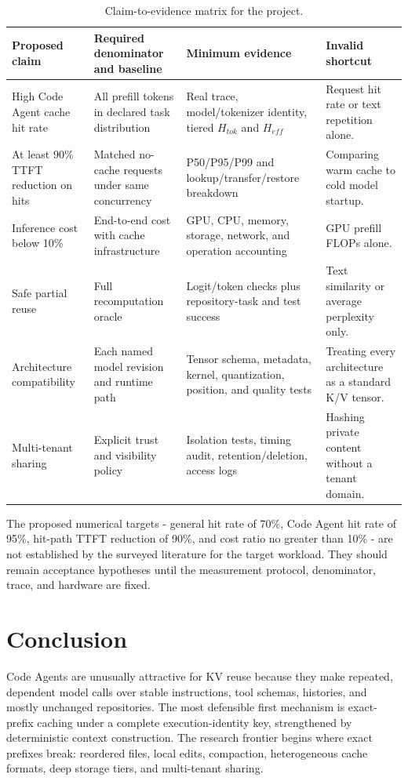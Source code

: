 \documentclass[conference,10pt]{IEEEtran}
\newcommand{\ttft}{TTFT\xspace}
\begin{document}
\begin{table}[t]
\caption{Claim-to-evidence matrix for the project.}
\label{tab:agenda}
\centering
\small
\begin{tabularx}{\textwidth}{p{}p{}p{}Y}
\toprule
Proposed claim & Required denominator and baseline & Minimum evidence & Invalid shortcut \\
\midrule
High Code Agent cache hit rate & All prefill tokens in declared task distribution & Real trace, model/tokenizer identity, tiered $H_{tok}$ and $H_{eff}$ & Request hit rate or text repetition alone. \\
At least 90\% \ttft reduction on hits & Matched no-cache requests under same concurrency & P50/P95/P99 and lookup/transfer/restore breakdown & Comparing warm cache to cold model startup. \\
Inference cost below 10\% & End-to-end cost with cache infrastructure & GPU, CPU, memory, storage, network, and operation accounting & GPU prefill FLOPs alone. \\
Safe partial reuse & Full recomputation oracle & Logit/token checks plus repository-task and test success & Text similarity or average perplexity only. \\
Architecture compatibility & Each named model revision and runtime path & Tensor schema, metadata, kernel, quantization, position, and quality tests & Treating every architecture as a standard K/V tensor. \\
Multi-tenant sharing & Explicit trust and visibility policy & Isolation tests, timing audit, retention/deletion, access logs & Hashing private content without a tenant domain. \\
\bottomrule
\end{tabularx}
\end{table}

The proposed numerical targets - general hit rate of 70\%, Code Agent hit rate of 95\%, hit-path \ttft reduction of 90\%, and cost ratio no greater than 10\% - are not established by the surveyed literature for the target workload. They should remain acceptance hypotheses until the measurement protocol, denominator, trace, and hardware are fixed.

\section{Conclusion}

Code Agents are unusually attractive for KV reuse because they make repeated, dependent model calls over stable instructions, tool schemas, histories, and mostly unchanged repositories. The most defensible first mechanism is exact-prefix caching under a complete execution-identity key, strengthened by deterministic context construction. The research frontier begins where exact prefixes break: reordered files, local edits, compaction, heterogeneous cache formats, deep storage tiers, and multi-tenant sharing.
\end{document}
